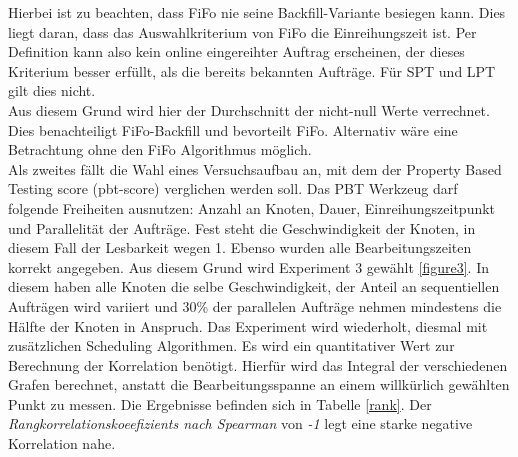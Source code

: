 Hierbei ist zu beachten, dass FiFo nie seine Backfill-Variante besiegen kann. Dies liegt daran, dass das Auswahlkriterium von FiFo die Einreihungszeit ist. Per Definition kann also kein online eingereihter Auftrag erscheinen, der dieses Kriterium besser erfüllt, als die bereits bekannten Aufträge. Für SPT und LPT gilt dies nicht.\\
Aus diesem Grund wird hier der Durchschnitt der nicht-null Werte verrechnet. Dies benachteiligt FiFo-Backfill und bevorteilt FiFo. Alternativ wäre eine Betrachtung ohne den FiFo Algorithmus möglich.\\
Als zweites fällt die Wahl eines Versuchsaufbau an, mit dem der Property Based Testing score (pbt-score) verglichen werden soll. Das PBT Werkzeug darf folgende Freiheiten ausnutzen: Anzahl an Knoten, Dauer, Einreihungszeitpunkt und Parallelität der Aufträge. Fest steht die Geschwindigkeit der Knoten, in diesem Fall der Lesbarkeit wegen 1. Ebenso wurden alle Bearbeitungszeiten korrekt angegeben. Aus diesem Grund wird Experiment 3 gewählt \ref{figure3}. In diesem haben alle Knoten die selbe Geschwindigkeit, der Anteil an sequentiellen Aufträgen wird variiert und 30\% der parallelen Aufträge nehmen mindestens die Hälfte der Knoten in Anspruch. Das Experiment wird wiederholt, diesmal mit zusätzlichen Scheduling Algorithmen. Es wird ein quantitativer Wert zur Berechnung der Korrelation benötigt. Hierfür wird das Integral der verschiedenen Grafen berechnet, anstatt die Bearbeitungsspanne an einem willkürlich gewählten Punkt zu messen.
Die Ergebnisse befinden sich in Tabelle \ref{rank}. Der \emph{Rangkorrelationskoeefizients nach Spearman} von \emph{-1}  legt eine starke negative Korrelation nahe. \\

